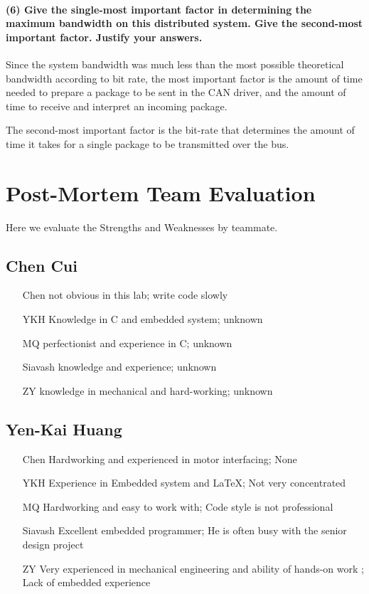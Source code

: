 \documentclass[a4paper]{article}
\begin{document}
\paragraph{(6) Give the single-most important factor in determining the maximum bandwidth on this distributed system.
Give the second-most important factor. Justify your answers.  \\ }

Since the system bandwidth was much less than the most possible theoretical bandwidth according to bit rate, the most important factor is the amount of time needed to prepare a package to be sent in the CAN driver, and the amount of time to receive and interpret an incoming package.

The second-most important factor is the bit-rate that determines the amount of time it takes for a single package to be transmitted over the bus.

\newpage
\section{Post-Mortem Team Evaluation}
Here we evaluate the Strengths and Weaknesses by teammate.

\subsection{Chen Cui}
\begin{itemize}
\item[Chen] not obvious in this lab; write code slowly
\item[YKH] Knowledge in C and embedded system; unknown
\item[MQ] perfectionist and experience in C; unknown
\item[Siavash] knowledge and experience; unknown
\item[ZY] knowledge in mechanical and hard-working; unknown
\end{itemize}

\subsection{Yen-Kai Huang}
\begin{itemize}
\item[Chen] Hardworking and experienced in motor interfacing; None
\item[YKH]  Experience in Embedded system and \LaTeX; Not very concentrated
\item[MQ]   Hardworking and easy to work with; Code style is not professional
\item[Siavash] Excellent embedded programmer; He is often busy with the senior design project
\item[ZY]   Very experienced in mechanical engineering and ability of hands-on work ; Lack of embedded experience
\end{itemize}
\end{document}
